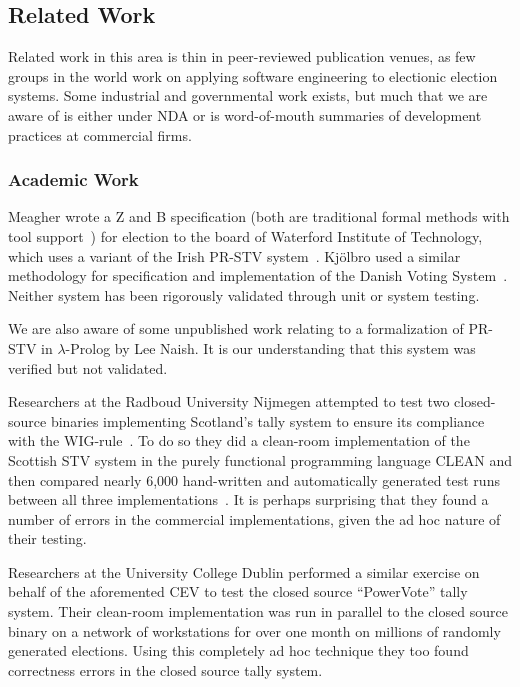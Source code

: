 \documentclass[runningheads,a4paper]{llncs}
\begin{document}
\subsection{Related Work}

Related work in this area is thin in peer-reviewed publication venues,
as few groups in the world work on applying software engineering to
electionic election systems.  Some industrial and governmental work
exists, but much that we are aware of is either under NDA or is
word-of-mouth summaries of development practices at commercial firms.

\subsubsection{Academic Work}

Meagher wrote a Z and B specification (both are traditional formal
methods with tool support~\cite{Wing90}) for election to the board of
Waterford Institute of Technology, which uses a variant of the Irish
PR-STV system~\cite{Meagher01}.  Kj\"{o}lbro used a similar
methodology for specification and implementation of the Danish Voting
System~\cite{Kjolbro11}.  Neither system has been rigorously
validated through unit or system testing.

We are also aware of some unpublished work relating to a formalization
of PR-STV in $\lambda$-Prolog by Lee Naish.  It is our understanding
that this system was verified but not validated.

Researchers at the Radboud University Nijmegen attempted to test two
closed-source binaries implementing Scotland's tally system to ensure
its compliance with the WIG-rule~\cite{Scotland}.  To do so they did a
clean-room implementation of the Scottish STV system in the purely
functional programming language CLEAN and then compared nearly 6,000
hand-written and automatically generated test runs between all three
implementations~\cite{KoopmanEtAl07,KoopmanPlasmeijer11}.  It is
perhaps surprising that they found a number of errors in the
commercial implementations, given the ad hoc nature of their testing.

Researchers at the University College Dublin performed a similar
exercise on behalf of the aforemented CEV to test the closed source
``PowerVote'' tally system.  Their clean-room implementation was run
in parallel to the closed source binary on a network of workstations
for over one month on millions of randomly generated elections.  Using
this completely ad hoc technique they too found correctness errors in
the closed source tally system.
\end{document}
